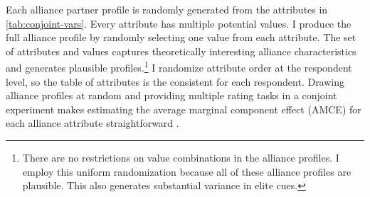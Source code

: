 \documentclass[12pt]{article}
\begin{document}
Each alliance partner profile is randomly generated from the attributes in \autoref{tab:conjoint-vars}.
Every attribute has multiple potential values.
I produce the full alliance profile by randomly selecting one value from each attribute. 
The set of attributes and values captures theoretically interesting alliance characteristics and generates plausible profiles.\footnote{There are no restrictions on value combinations in the alliance profiles. I employ this uniform randomization because all of these alliance profiles are plausible. This also generates substantial variance in elite cues.} %
I randomize attribute order at the respondent level, so the table of attributes is the consistent for each respondent. 
Drawing alliance profiles at random and providing multiple rating tasks in a conjoint experiment makes estimating the average marginal component effect (AMCE) for each alliance attribute straightforward \citep{Hainmuelleretal2014}. 
\end{document}
